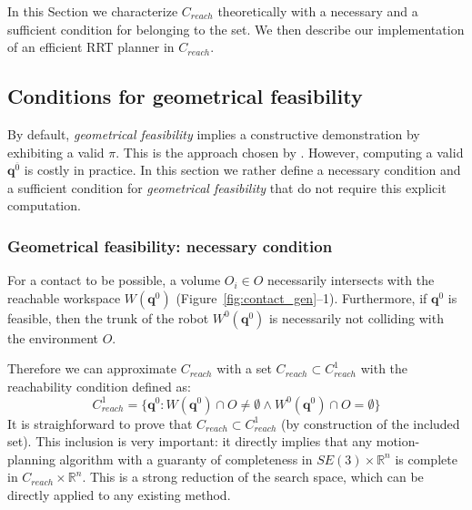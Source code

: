 In this Section we characterize $C_{reach}$ theoretically with a necessary and a sufficient condition for belonging to the set.
We then describe our implementation of an efficient RRT planner in $C_{reach}$.

   
 
\subsection{Conditions for geometrical feasibility}
By default, \textit{geometrical feasibility} implies a constructive demonstration by exhibiting a valid $\pi$. This is the approach chosen by \cite{Bouyarmane2009}. However, computing a valid  $\mathbf{q}^{\overline{0}}$ is costly in practice. In this section we rather define a necessary condition and a sufficient condition for \textit{geometrical feasibility} that do not require this explicit computation.




\subsubsection*{Geometrical feasibility: necessary condition}
For a contact to be possible, a volume $O_i \in O$ necessarily intersects with the reachable workspace $W(\mathbf{q}^{0})$ (Figure~\ref{fig:contact_gen}--1). Furthermore, if $\mathbf{q}^{0}$ is  feasible, then the trunk of the robot $W^0(\mathbf{q}^{0})$ is necessarily not colliding  with the environment $O$.

Therefore we can approximate $C_{reach}$ with a set $C_{reach} \subset C_{reach}^1$ with the reachability condition defined as: 
\begin{equation}
C_{reach}^1 = \{ \mathbf{q}^0 : W(\mathbf{q}^{0}) \cap O \neq \emptyset \wedge W^0(\mathbf{q}^{0}) \cap O = \emptyset \} %
\end{equation}
It is straighforward to prove that  $C_{reach} \subset C_{reach}^1$ (by construction of the included set). 
This inclusion is very important: it directly implies that any motion-planning algorithm with a guaranty of completeness in $SE(3) \times \mathbb{R}^n$ is complete  in $C_{reach} \times \mathbb{R}^n$. This is a strong reduction of the search space, which can be directly applied to any existing method.
 
